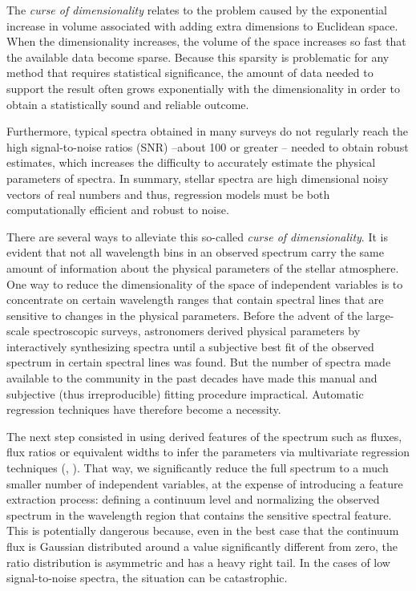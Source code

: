 \documentclass[a4paper,fleqn,usenatbib]{mnras}
\begin{document}
The \textit{curse of dimensionality} \citep{bellman:61} relates to 
the problem caused by the exponential increase in volume associated 
with adding extra dimensions to Euclidean space. 
When the dimensionality increases, the volume of the space increases so 
fast that the available data become sparse. Because this sparsity is 
problematic for any method that requires statistical significance, the 
amount of data needed to support the result often grows exponentially 
with the dimensionality in order to obtain a statistically sound and 
reliable outcome.

Furthermore, typical spectra obtained in many surveys do not 
regularly reach the high signal-to-noise ratios (SNR) --about
100 or greater -- needed to obtain robust estimates, which
increases the difficulty to accurately estimate the physical
parameters of spectra.  In summary, stellar spectra are high
dimensional noisy vectors of real numbers and thus,
regression models must be both computationally efficient and robust
to noise.

There are several ways to alleviate this so-called \textit{curse of
  dimensionality}. It is evident that not all wavelength bins in an
observed spectrum carry the same amount of information about the
physical parameters of the stellar atmosphere. One way to reduce the
dimensionality of the space of independent variables is to concentrate
on certain wavelength ranges that contain spectral lines that are
sensitive to changes in the physical parameters. Before the
advent of the large-scale spectroscopic surveys, astronomers derived
physical parameters by interactively synthesizing spectra until a
subjective best fit of the observed spectrum in certain spectral lines
was found. But the number of spectra made available to the community
in the past decades have made this manual and subjective (thus
irreproducible) fitting procedure impractical. Automatic regression
techniques have therefore become a necessity.

The next step consisted in using derived features of the spectrum such
as fluxes, flux ratios or equivalent widths to infer the parameters
via multivariate regression techniques (\cite{2006ApJ...636..804A},
\cite{2012ApJ...750L..37M}). That way, we significantly reduce the
full spectrum to a much smaller number of independent variables, at
the expense of introducing a feature extraction process: defining a
continuum level and normalizing the observed spectrum in the
wavelength region that contains the sensitive spectral feature. This
is potentially dangerous because, even in the best case that the
continuum flux is Gaussian distributed around a value significantly
different from zero, the ratio distribution is asymmetric and has a
heavy right tail. In the cases of low signal-to-noise spectra, the
situation can be catastrophic.
\end{document}
